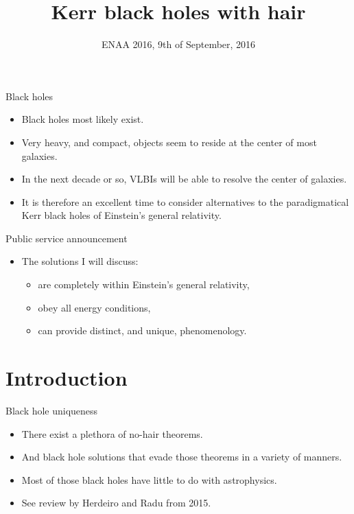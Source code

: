 \documentclass[xcolor=dvipsnames]{beamer}
\title[]{Kerr black holes with hair}
\author[Helgi,Carlos,Eugen] %
{\textbf{Helgi Freyr Rúnarsson}\\[3mm] \small{\and C.~Herdeiro \and E. Radu \and P. Cunha \and J. Delgado}}%
\institute[Universities Here and There] %
{
  Department of Physics and CIDMA\\
  Universidade de Aveiro
}
\date %
{ENAA 2016, 9th of September, 2016}
\begin{document}
\begin{frame}[plain]
  \titlepage
\end{frame}

\begin{frame}{Black holes}
  \begin{itemize}[<+->]
    \item Black holes most likely exist.
    \item Very heavy, and compact, objects seem to reside at the center of most galaxies.
    \item In the next decade or so, VLBIs will be able to resolve the center of galaxies.
    \item It is therefore an excellent time to consider alternatives to the paradigmatical Kerr black holes of Einstein's general relativity.
  \end{itemize}
\end{frame}

\begin{frame}{Public service announcement}
  \begin{itemize}[<+->]
    \item The solutions I will discuss:
  \begin{itemize}[<+->]
    \item are completely within Einstein's general relativity,
    \item obey all energy conditions,
    \item can provide distinct, and unique, phenomenology.
  \end{itemize}
  \end{itemize}
\end{frame}

\subsection{}
\begin{frame}[plain]{}
  \tableofcontents
\end{frame}

\section{Introduction}

\begin{frame}{Black hole uniqueness}
  \begin{itemize}[<+->]
    \item There exist a plethora of no-hair theorems.
    \item And black hole solutions that evade those theorems in a variety of manners.
    \item Most of those black holes have little to do with astrophysics.
    \item See review by Herdeiro and Radu from 2015.
  \end{itemize}
\end{frame}
\end{document}
